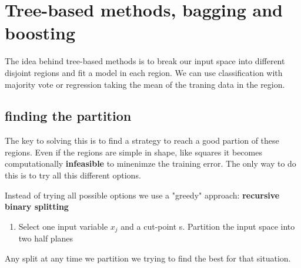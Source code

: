 
\section{Tree-based methods, bagging and boosting}
The idea behind tree-based methods is to break our input space into different disjoint regions and fit a model in each region. We can use classification with majority vote or regression taking the mean of the traning data in the region. 

\subsection*{finding the partition}
The key to solving this is to find a strategy to reach a good partion of these regions. Even if the regions are simple in shape, like squares it becomes computationally \textbf{infeasible} to minenimze the training error. The only way to do this is to try all this different options. 

Instead of trying all possible options we use a "greedy" approach: \textbf{recursive binary splitting} 

\begin{enumerate}
 	\item Select one input variable $x_j$ and a cut-point s. Partition the input space into two half planes

 \end{enumerate} 

 Any split at any time we partition we trying to find the best for that situation. 
 
